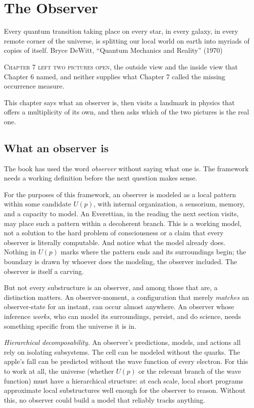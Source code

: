 \chapter{The Observer}

\chapterepigraph
{Every quantum transition taking place on every star, in every galaxy, in every remote corner of the universe, is splitting our local world on earth into myriads of copies of itself.}
{Bryce DeWitt, ``Quantum Mechanics and Reality'' (1970)}

\noindent \textsc{Chapter 7 left two pictures open}, the outside view and the inside view that Chapter 6 named, and neither supplies what Chapter 7 called the missing occurrence measure.

This chapter says what an observer is, then visits a landmark in physics that offers a multiplicity of its own, and then asks which of the two pictures is the real one.

\section*{What an observer is}

The book has used the word \emph{observer} without saying what one is. The framework needs a working definition before the next question makes sense.

For the purposes of this framework, an observer is modeled as a local pattern within some candidate $U(p)$, with internal organization, a sensorium, memory, and a capacity to model. An Everettian, in the reading the next section visits, may place such a pattern within a decoherent branch. This is a working model, not a solution to the hard problem of consciousness or a claim that every observer is literally computable. And notice what the model already does. Nothing in $U(p)$ marks where the pattern ends and its surroundings begin; the boundary is drawn by whoever does the modeling, the observer included. The observer is itself a carving.

But not every substructure is an observer, and among those that are, a distinction matters. An observer-moment, a configuration that merely \emph{matches} an observer-state for an instant, can occur almost anywhere. An observer whose inference \emph{works}, who can model its surroundings, persist, and do science, needs something specific from the universe it is in.

\emph{Hierarchical decomposability.} An observer's predictions, models, and actions all rely on isolating subsystems. The cell can be modeled without the quarks. The apple's fall can be predicted without the wave function of every electron. For this to work at all, the universe (whether $U(p)$ or the relevant branch of the wave function) must have a hierarchical structure: at each scale, local short programs approximate local substructures well enough for the observer to reason. Without this, no observer could build a model that reliably tracks anything.

